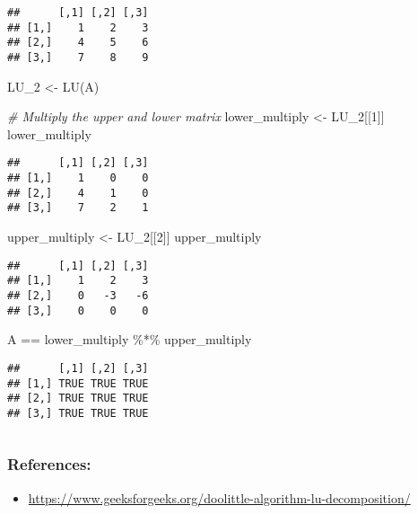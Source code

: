 \documentclass[
]{article}
\newenvironment{Shaded}{\begin{snugshade}}{\end{snugshade}}
\newcommand{\CommentTok}[1]{\textcolor[rgb]{0.56,0.35,0.01}{\textit{#1}}}
\newcommand{\DecValTok}[1]{\textcolor[rgb]{0.00,0.00,0.81}{#1}}
\newcommand{\FunctionTok}[1]{\textcolor[rgb]{0.00,0.00,0.00}{#1}}
\newcommand{\NormalTok}[1]{#1}
\newcommand{\OtherTok}[1]{\textcolor[rgb]{0.56,0.35,0.01}{#1}}
\newcommand{\SpecialCharTok}[1]{\textcolor[rgb]{0.00,0.00,0.00}{#1}}
\providecommand{\tightlist}{%
  \setlength{\itemsep}{0pt}\setlength{\parskip}{0pt}}
\begin{document}
\begin{verbatim}
##      [,1] [,2] [,3]
## [1,]    1    2    3
## [2,]    4    5    6
## [3,]    7    8    9
\end{verbatim}

\begin{Shaded}
\begin{Highlighting}[]
\NormalTok{LU\_2 }\OtherTok{\textless{}{-}} \FunctionTok{LU}\NormalTok{(A)}

\CommentTok{\# Multiply the upper and lower matrix}
\NormalTok{lower\_multiply }\OtherTok{\textless{}{-}}\NormalTok{ LU\_2[[}\DecValTok{1}\NormalTok{]]}
\NormalTok{lower\_multiply}
\end{Highlighting}
\end{Shaded}

\begin{verbatim}
##      [,1] [,2] [,3]
## [1,]    1    0    0
## [2,]    4    1    0
## [3,]    7    2    1
\end{verbatim}

\begin{Shaded}
\begin{Highlighting}[]
\NormalTok{upper\_multiply }\OtherTok{\textless{}{-}}\NormalTok{ LU\_2[[}\DecValTok{2}\NormalTok{]]}
\NormalTok{upper\_multiply}
\end{Highlighting}
\end{Shaded}

\begin{verbatim}
##      [,1] [,2] [,3]
## [1,]    1    2    3
## [2,]    0   -3   -6
## [3,]    0    0    0
\end{verbatim}

\begin{Shaded}
\begin{Highlighting}[]
\NormalTok{A }\SpecialCharTok{==}\NormalTok{ lower\_multiply }\SpecialCharTok{\%*\%}\NormalTok{ upper\_multiply}
\end{Highlighting}
\end{Shaded}

\begin{verbatim}
##      [,1] [,2] [,3]
## [1,] TRUE TRUE TRUE
## [2,] TRUE TRUE TRUE
## [3,] TRUE TRUE TRUE
\end{verbatim}

\(~\)

\hypertarget{references}{%
\subsubsection{References:}\label{references}}

\begin{itemize}
\tightlist
\item
  \url{https://www.geeksforgeeks.org/doolittle-algorithm-lu-decomposition/}
\end{itemize}
\end{document}
